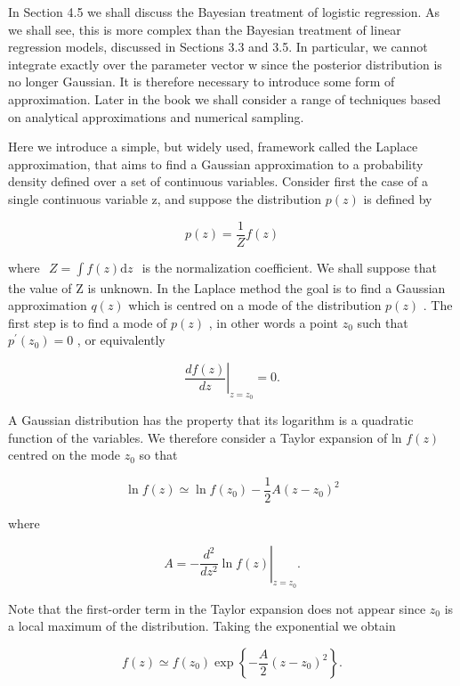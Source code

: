 \documentclass[
  10
]{article}
\begin{document}
In Section 4.5 we shall discuss the Bayesian treatment of logistic
regression. As we shall see, this is more complex than the Bayesian
treatment of linear regression models, discussed in Sections 3.3 and
3.5. In particular, we cannot integrate exactly over the parameter
vector w since the posterior distribution is no longer Gaussian. It is
therefore necessary to introduce some form of approximation. Later in
the book we shall consider a range of techniques based on analytical
approximations and numerical sampling.

Here we introduce a simple, but widely used, framework called the
Laplace approximation, that aims to find a Gaussian approximation to a
probability density defined over a set of continuous variables. Consider
first the case of a single continuous variable z, and suppose the
distribution \(p ( z )\) is defined by

\[
p (z) = \frac {1}{Z} f (z)\tag{4.125}
\]

where
\(\begin{array} { r } { Z = \int f ( z ) \mathrm { d } z } \end{array}\)
is the normalization coefficient. We shall suppose that the value of Z
is unknown. In the Laplace method the goal is to find a Gaussian
approximation \(q ( z )\) which is centred on a mode of the distribution
\(p ( z )\) . The first step is to find a mode of \(p ( z )\) , in other
words a point \(z _ { \mathrm { 0 } }\) such that
\(p ^ { \prime } ( z _ { 0 } ) = 0\) , or equivalently

\[
\left. \frac {d f (z)}{d z} \right| _ {z = z _ {0}} = 0.\tag{4.126}
\]

A Gaussian distribution has the property that its logarithm is a
quadratic function of the variables. We therefore consider a Taylor
expansion of ln \(f ( z )\) centred on the mode
\(z _ { \mathrm { 0 } }\) so that

\[
\ln f (z) \simeq \ln f (z _ {0}) - \frac {1}{2} A (z - z _ {0}) ^ {2}\tag{4.127}
\]

where

\[
A = - \left. \frac {d ^ {2}}{d z ^ {2}} \ln f (z) \right| _ {z = z _ {0}}.\tag{4.128}
\]

Note that the first-order term in the Taylor expansion does not appear
since \(z _ { 0 }\) is a local maximum of the distribution. Taking the
exponential we obtain

\[
f (z) \simeq f (z _ {0}) \exp \left\{- \frac {A}{2} (z - z _ {0}) ^ {2} \right\}.\tag{4.129}
\]
\end{document}
